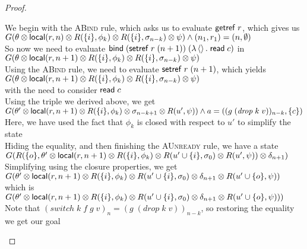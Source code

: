 \begin{proof}
\begin{tabbedproof}
\ooo We begin with the \textsc{ABind} rule, which asks us to evaluate $\mathsf{getref}\; r$, which gives us \\
\ooo $G(\theta \otimes \mathsf{local}({r}, {n}) \otimes R(\{{i}\}, \phi_k) \otimes R(\{{i}\}, \sigma_{n-k}) \otimes \psi) \land (n_1,r_1) = (n,\emptyset)$ \\
\ooo So now we need to evaluate $\mathsf{bind}\; (\mathsf{setref}\; r\;(n+1))\; (\lambda \left<\right>.\;\mathsf{read}\; c)$ in \\
\ooo $G(\theta \otimes \mathsf{local}({r}, {n+1}) \otimes R(\{{i}\}, \phi_k) \otimes R(\{{i}\}, \sigma_{n-k}) \otimes \psi)$ \\
\ooo Using the \textsc{ABind} rule, we need to evaluate $\mathsf{setref}\; r\;(n+1)$, which yields  \\
\ooo $G(\theta \otimes \mathsf{local}({r}, {n+1}) \otimes R(\{{i}\}, \phi_k) \otimes R(\{{i}\}, \sigma_{n-k}) \otimes \psi)$ \\
\ooo with the need to consider $\mathsf{read}\; c$ \\
\ooo Using the triple we derived above, we get \\
\ooo $G(\theta' \otimes \mathsf{local}({r}, {n+1}) \otimes R(\{{i}\}, \phi_k) \otimes \sigma_{n-k+1} \otimes R(u', \psi))
      \land a = ((g\;(\mathit{drop}\;k\;v))_{n-k}, \{{c}\})$ \\
\ooo Here, we have used the fact that $\phi_k$ is closed with respect to $u'$ to simplify the state\\
\ooo Hiding the equality, and then finishing the \textsc{AUnready} rule, we have a state \\
\ooo $G(R(\{{o}\}, \theta' \otimes \mathsf{local}({r}, {n+1}) \otimes R(\{{i}\}, \phi_k) \otimes R(u' \cup \{{i}\}, \sigma_0) \otimes R(u', \psi)) \otimes \delta_{n+1})$\\
\ooo Simplifying using the closure properties, we get \\
\ooo $G(\theta' \otimes \mathsf{local}({r}, {n+1}) \otimes R(\{{i}\}, \phi_k) \otimes R(u' \cup \{{i}\}, \sigma_0) \otimes \delta_{n+1} \otimes R(u' \cup \{{o}\}, \psi))$\\
\ooo which is \\
\ooo $G(\theta' \otimes \mathsf{local}({r}, {n+1}) \otimes R(\{{i}\}, \phi_k) \otimes R(u' \cup \{{i}\}, \sigma_0) \otimes \delta_{n+1} \otimes R(u' \cup \{{o}\}, \psi)))$\\
\ooo Note that $(\mathit{switch}\;k\;f\;g\;v)_n = (g\;(\mathit{drop}\;k\;v))_{n-k}$, so restoring the equality \\
\oox we get our goal
\end{tabbedproof}
\end{proof}

